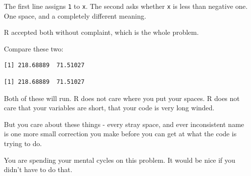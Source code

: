 \documentclass[
  letterpaper,
  justified,
  a4paper]{tufte-book}
\makeatletter
\newenvironment{Shaded}{\begin{snugshade}}{\end{snugshade}}
\newcommand{\DecValTok}[1]{\textcolor[rgb]{0.68,0.00,0.00}{#1}}
\newcommand{\FunctionTok}[1]{\textcolor[rgb]{0.28,0.35,0.67}{#1}}
\newcommand{\NormalTok}[1]{\textcolor[rgb]{0.00,0.23,0.31}{#1}}
\newcommand{\OtherTok}[1]{\textcolor[rgb]{0.00,0.23,0.31}{#1}}
\newcommand{\SpecialCharTok}[1]{\textcolor[rgb]{0.37,0.37,0.37}{#1}}
\let\rbporigShaded\Shaded
\let\rbporigendShaded\endShaded
\renewenvironment{Shaded}{%
  \begingroup
  \ifdim\linewidth=\rbpbodywidth
    \advance\linewidth by \@tufte@overhang
    \advance\hsize by \@tufte@overhang
    \advance\columnwidth by \@tufte@overhang
  \fi
  \rbporigShaded
}{%
  \rbporigendShaded
  \endgroup
}
\makeatother
\begin{document}
The first line assigns \texttt{1} to \texttt{x}. The second asks whether
\texttt{x} is less than negative one. One space, and a completely
different meaning.

R accepted both without complaint, which is the whole problem.

Compare these two:

\begin{Shaded}
\end{Shaded}

\begin{verbatim}
[1] 218.68889  71.51027
\end{verbatim}

\begin{Shaded}
\end{Shaded}

\begin{verbatim}
[1] 218.68889  71.51027
\end{verbatim}

Both of these will run. R does not care where you put your spaces. R
does not care that your variables are short, that your code is very long
winded.

But you care about these things - every stray space, and ever
inconsistent name is one more small correction you make before you can
get at what the code is trying to do.

You are spending your mental cycles on this problem. It would be nice if
you didn't have to do that.
\end{document}
